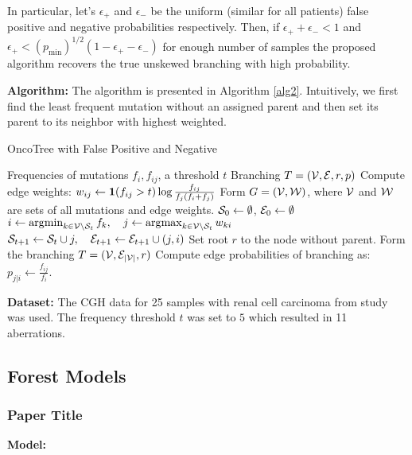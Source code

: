 	In particular, let's $\epsilon_+$ and $\epsilon_-$ be the uniform (similar for all patients) false positive and negative probabilities respectively. 
	Then, if $\epsilon_+ + \epsilon_- < 1$ and $\epsilon_+ < (p_{\min})^{1/2} (1 - \epsilon_+ - \epsilon_-)$ for enough number of samples the proposed algorithm recovers the true unskewed branching with high probability.	
	
	{\bf Algorithm:}
	The algorithm is presented in Algorithm \ref{alg2}. 
	Intuitively, we first find the least frequent mutation without an assigned parent and then set its parent to its neighbor with highest weighted.  
	
	\begin{algorithm}[t]
		\caption{OncoTree with False Positive and Negative}
		\label{alg2}
		\begin{algorithmic}[1]
			 Frequencies of mutations $f_i, f_{ij}$, a threshold $t$
			 Branching $T = ({\cal V}, {\cal E}, r, p)$
			\STATE Compute edge weights: $w_{ij} \leftarrow {\large \bf 1}(f_{ij} > t) \log \frac{f_{ij}}{f_j(f_i + f_j)}$
			\STATE Form $G = ({\cal V}, {\cal W})$, where ${\cal V}$ and ${\cal W}$ are sets of all mutations and edge weights.
			\STATE ${\cal S}_0 \leftarrow \emptyset$, ${\cal E}_0 \leftarrow \emptyset$
			\STATE $i \leftarrow \operatorname*{\arg\!\min}_{k \in {\cal V} \setminus {\cal S}_t} f_k, \quad j \leftarrow \operatorname*{\arg\!\max}_{k \in {\cal V} \setminus {\cal S}_t} w_{ki}$
			\STATE ${\cal S}_{t+1} \leftarrow {\cal S}_t \cup {j}, \quad {\cal E}_{t+1} \leftarrow {\cal E}_{t+1} \cup {(j, i)} $
			\ENDFOR 
			\STATE Set root $r$ to the node without parent.
			\STATE Form the branching $T = ({\cal V}, {\cal E}_{|{\cal V}|}, r)$
			\STATE Compute edge probabilities of branching as:  $p_{j|i} \leftarrow \frac{f_{ij}}{f_i}$.
		\end{algorithmic}
	\end{algorithm}
	
	
	{\bf Dataset:} 
	The CGH \cite{kallioniemi92} data for 25 samples with renal cell carcinoma from \cite{jiang98} study was used. 
	The frequency threshold $t$ was set to $5$ which resulted in 11 aberrations. 

	
	
	\subsection{Forest Models}
	
	\subsubsection{Paper Title}
	{\bf Model:}
	
